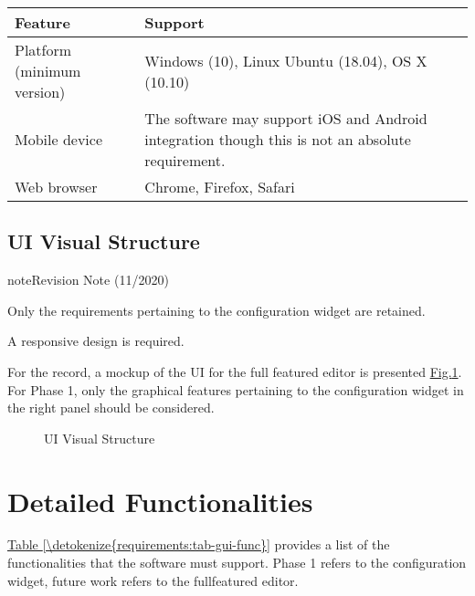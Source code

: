 \documentclass[letterpaper,10pt, openany,english]{sphinxmanual}
\begin{document}
\begin{savenotes}\sphinxattablestart
\centering
{}
\sphinxthecaptionisattop
{}\label{\detokenize{requirements:id15}}\label{\detokenize{requirements:tab-environment}}
\sphinxaftertopcaption
\begin{tabulary}{\linewidth}[t]{|T|T|}
\hline
\sphinxstyletheadfamily 
Feature
&\sphinxstyletheadfamily 
Support
\\
\hline
Platform (minimum version)
&
Windows (10), Linux Ubuntu (18.04), OS X (10.10)
\\
\hline
Mobile device
&
The software may support iOS and Android
integration though this is not an absolute
requirement.
\\
\hline
Web browser
&
Chrome, Firefox, Safari
\\
\hline
\end{tabulary}
\par
\sphinxattableend\end{savenotes}


\subsection{UI Visual Structure}
\label{\detokenize{requirements:ui-visual-structure}}
\begin{sphinxadmonition}{note}{Revision Note (11/2020)}

Only the requirements pertaining to the configuration widget are retained.
\end{sphinxadmonition}

A responsive design is required.

For the record, a mockup of the UI for the full featured editor is presented \hyperref[\detokenize{requirements:screen-mockup}]{Fig.\@ \ref{\detokenize{requirements:screen-mockup}}}.
For Phase 1, only the graphical features pertaining to the configuration widget in the right panel should be considered.

\begin{figure}[htbp]
\centering
\capstart

\noindent{}
\caption{UI Visual Structure}\label{\detokenize{requirements:screen-mockup}}\end{figure}


\section{Detailed Functionalities}
\label{\detokenize{requirements:detailed-functionalities}}\label{\detokenize{requirements:sec-functionalities}}
\hyperref[\detokenize{requirements:tab-gui-func}]{Table \ref{\detokenize{requirements:tab-gui-func}}} provides a list of the functionalities that the software must support. Phase 1 refers to the configuration widget, future work refers to the full\sphinxhyphen{}featured editor.
\end{document}
